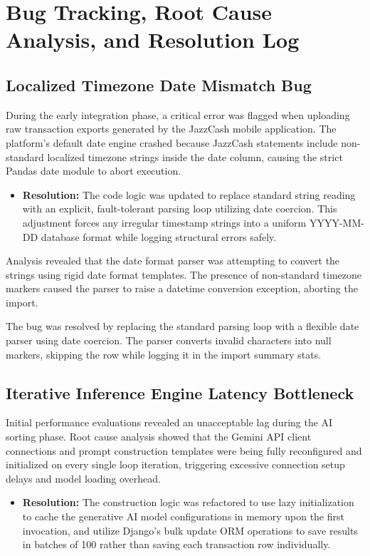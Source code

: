 \section{Bug Tracking, Root Cause Analysis, and Resolution Log}
\subsection{Localized Timezone Date Mismatch Bug}
During the early integration phase, a critical error was flagged when uploading raw transaction exports generated by the JazzCash mobile application. The platform's default date engine crashed because JazzCash statements include non-standard localized timezone strings inside the date column, causing the strict Pandas date module to abort execution.
\begin{itemize}
	\item \textbf{Resolution:} The code logic was updated to replace standard string reading with an explicit, fault-tolerant parsing loop utilizing date coercion. This adjustment forces any irregular timestamp strings into a uniform YYYY-MM-DD database format while logging structural errors safely.
\end{itemize}

Analysis revealed that the date format parser was attempting to convert the strings using rigid date format templates. The presence of non-standard timezone markers caused the parser to raise a datetime conversion exception, aborting the import.

The bug was resolved by replacing the standard parsing loop with a flexible date parser using date coercion. The parser converts invalid characters into null markers, skipping the row while logging it in the import summary stats.

\subsection{Iterative Inference Engine Latency Bottleneck}
Initial performance evaluations revealed an unacceptable lag during the AI sorting phase. Root cause analysis showed that the Gemini API client connections and prompt construction templates were being fully reconfigured and initialized on every single loop iteration, triggering excessive connection setup delays and model loading overhead.
\begin{itemize}
	\item \textbf{Resolution:} The construction logic was refactored to use lazy initialization to cache the generative AI model configurations in memory upon the first invocation, and utilize Django's bulk update ORM operations to save results in batches of 100 rather than saving each transaction row individually.
\end{itemize}

